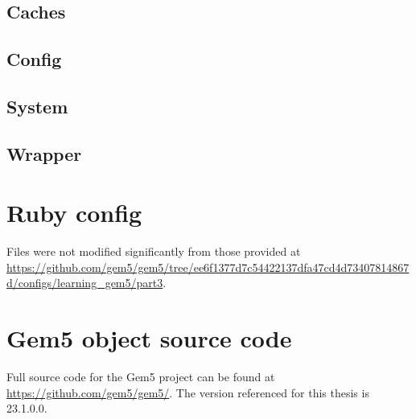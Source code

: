 \documentclass[12pt,twoside]{reedthesis}
\newcommand{\vstep}{\vspace{5mm}}
\begin{document}
\subsection*{Caches}

\vstep

\subsection*{Config}

\vstep

\subsection*{System}

\vstep

\subsection*{Wrapper}

\vstep

\section{Ruby config}

Files were not modified significantly from those provided at \url{https://github.com/gem5/gem5/tree/ee6f1377d7c54422137dfa47cd4d73407814867d/configs/learning_gem5/part3}.

\section{Gem5 object source code}

Full source code for the Gem5 project can be found at \url{https://github.com/gem5/gem5/}. The version referenced for this thesis is 23.1.0.0.

\nocite{*}
\printbibliography[title=References]
\end{document}
